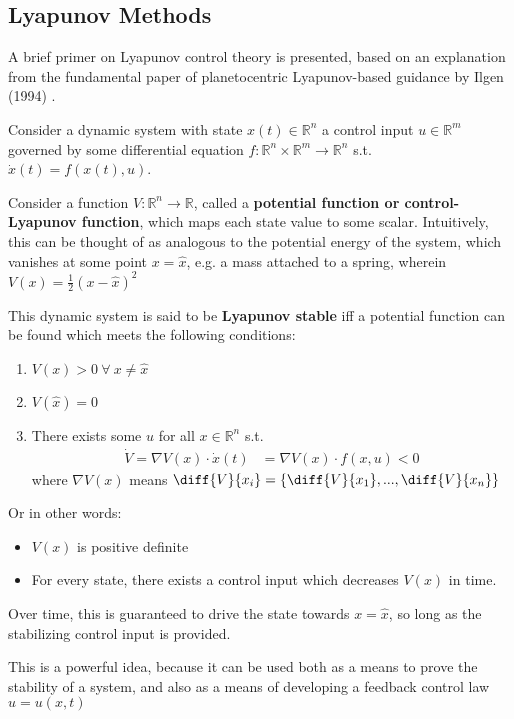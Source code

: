 \subsection{Lyapunov Methods}
A brief primer on Lyapunov control theory is presented, based on an explanation from the fundamental paper of planetocentric Lyapunov-based guidance by Ilgen (1994) \cite{ilgen1994low}.

Consider a dynamic system with state \(x(t) \in \mathbb{R}^n\) a control input \(u \in \mathbb{R}^m\) governed by some differential equation \(f : \mathbb{R}^n \times \mathbb{R}^m \to \mathbb{R}^n\) s.t. \(\dot{x}(t) = f(x(t), u)\).

Consider a function \(V: \mathbb{R}^n \to \mathbb{R}\), called a \textbf{potential function or control-Lyapunov function}, which maps each state value to some scalar. Intuitively, this can be thought of as analogous to the potential energy of the system, which vanishes at some point \(x = \hat{x}\), e.g. a mass attached to a spring, wherein \(V(x) = \frac{1}{2}(x-\hat{x})^2\)

This dynamic system is said to be \textbf{Lyapunov stable} iff a potential function can be found which meets the following conditions:
\begin{enumerate}
  \item \(V(x) > 0\  \forall \ x \neq \hat{x}\)
  \item \(V(\hat{x}) = 0\)
  \item There exists some \(u\) for all \(x \in \mathbb{R}^n\) s.t.
        \begin{align*}
          \dot{V}= \nabla V(x) \cdot \dot{x}(t) & = \nabla V(x) \cdot f(x, u) < 0
        \end{align*}
        where \(\nabla V(x)\) means \(\diff{V}{{x_i}} = \left\{\diff{V}{{x_1}}, ..., \diff{V}{{x_n}}  \right\}\)
\end{enumerate}
Or in other words:
\begin{itemize}
  \item \(V(x)\) is positive definite
  \item For every state, there exists a control input which decreases \(V(x)\) in time.
\end{itemize}

Over time, this is guaranteed to drive the state towards \(x = \hat{x}\), so long as the stabilizing control input is provided.

This is a powerful idea, because it can be used both as a means to prove the stability of a system, and also as a means of developing a feedback control law \(u = u(x, t)\)

